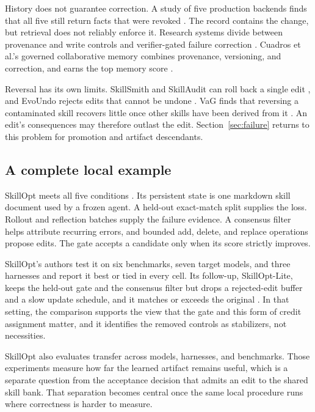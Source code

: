 \documentclass[
  11pt,
]{article}
\begin{document}
History does not guarantee correction. A study of five production backends finds that all five still return facts that were revoked \cite{shen2026revoked}. The record contains the change, but retrieval does not reliably enforce it. Research systems divide between provenance and write controls \cite{wang2026toki, xu2026ppmf, margalit2026governed, sun2026vermem} and verifier-gated failure correction \cite{yu2026recuris, wang2026memguard}. Cuadros et al.'s governed collaborative memory combines provenance, versioning, and correction, and earns the top memory score \cite{cuadros2026governed}.

Reversal has its own limits. SkillSmith and SkillAudit can roll back a single edit \cite{wei2026skillsmith, gao2026skillaudit}, and EvoUndo rejects edits that cannot be undone \cite{sah2026evoundo}. VaG finds that reversing a contaminated skill recovers little once other skills have been derived from it \cite{shang2026vag}. An edit's consequences may therefore outlast the edit. Section~\ref{sec:failure} returns to this problem for promotion and artifact descendants.

\subsection{A complete local example}\label{a-complete-local-example}

SkillOpt meets all five conditions \cite{yang2026skillopt}. Its persistent state is one markdown skill document used by a frozen agent. A held-out exact-match split supplies the loss. Rollout and reflection batches supply the failure evidence. A consensus filter helps attribute recurring errors, and bounded add, delete, and replace operations propose edits. The gate accepts a candidate only when its score strictly improves.

SkillOpt's authors test it on six benchmarks, seven target models, and three harnesses and report it best or tied in every cell. Its follow-up, SkillOpt-Lite, keeps the held-out gate and the consensus filter but drops a rejected-edit buffer and a slow update schedule, and it matches or exceeds the original \cite{shen2026skilloptlite}. In that setting, the comparison supports the view that the gate and this form of credit assignment matter, and it identifies the removed controls as stabilizers, not necessities.

SkillOpt also evaluates transfer across models, harnesses, and benchmarks. Those experiments measure how far the learned artifact remains useful, which is a separate question from the acceptance decision that admits an edit to the shared skill bank. That separation becomes central once the same local procedure runs where correctness is harder to measure.
\end{document}
